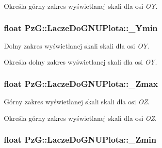 Określa górny zakres wyświetlanej skali dla osi {\itshape O\+Y}. \hypertarget{class_pz_g_1_1_lacze_do_g_n_u_plota_abc555fd6b82b0d5c9efb4802b58dc317}{
\subsubsection[{\+\_\+\+Ymin}]{\setlength{\rightskip}{0pt plus 5cm}float Pz\+G\+::\+Lacze\+Do\+G\+N\+U\+Plota\+::\+\_\+\+Ymin\hspace{0.3cm}{\ttfamily [protected]}}}\label{class_pz_g_1_1_lacze_do_g_n_u_plota_abc555fd6b82b0d5c9efb4802b58dc317}


Dolny zakres wyświetlanej skali skali dla osi {\itshape O\+Y}. 

Określa dolny zakres wyświetlanej skali dla osi {\itshape O\+Y}. \hypertarget{class_pz_g_1_1_lacze_do_g_n_u_plota_a26949eedd421832f0f206ce3c8f90694}{
\subsubsection[{\+\_\+\+Zmax}]{\setlength{\rightskip}{0pt plus 5cm}float Pz\+G\+::\+Lacze\+Do\+G\+N\+U\+Plota\+::\+\_\+\+Zmax\hspace{0.3cm}{\ttfamily [protected]}}}\label{class_pz_g_1_1_lacze_do_g_n_u_plota_a26949eedd421832f0f206ce3c8f90694}


Górny zakres wyświetlanej skali skali dla osi {\itshape O\+Z}. 

Określa górny zakres wyświetlanej skali dla osi {\itshape O\+Z}. \hypertarget{class_pz_g_1_1_lacze_do_g_n_u_plota_a8f9797e881df35f4206cb7d8030e5edc}{
\subsubsection[{\+\_\+\+Zmin}]{\setlength{\rightskip}{0pt plus 5cm}float Pz\+G\+::\+Lacze\+Do\+G\+N\+U\+Plota\+::\+\_\+\+Zmin\hspace{0.3cm}{\ttfamily [protected]}}}\label{class_pz_g_1_1_lacze_do_g_n_u_plota_a8f9797e881df35f4206cb7d8030e5edc}


